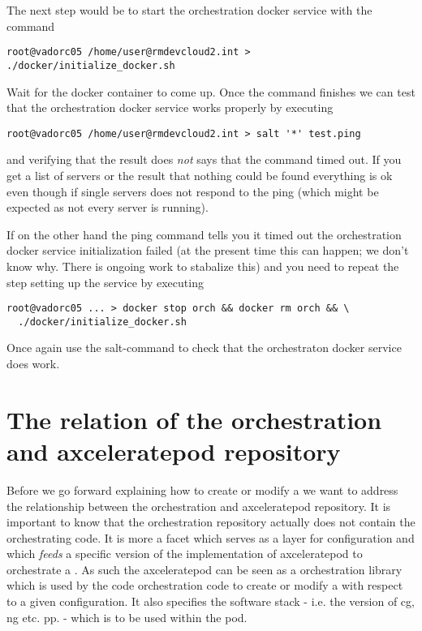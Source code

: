            The next step would be to start the orchestration docker service with the command
           \begin{verbatim}
root@vadorc05 /home/user@rmdevcloud2.int > ./docker/initialize_docker.sh
           \end{verbatim}
           Wait for the docker container to come up. Once the command finishes we can test that the orchestration docker service works properly by executing
           \begin{verbatim}
root@vadorc05 /home/user@rmdevcloud2.int > salt '*' test.ping
           \end{verbatim}
           and verifying that the result does \emph{not} says that the command timed out. If you get a list of servers or the result that nothing could be found everything is ok even though if single servers does not respond to the ping (which might be expected as not every server is running).

           If on the other hand the ping command tells you it timed out the orchestration docker service initialization failed (at the present time this can happen; we don't know why. There is ongoing work to stabalize this) and you need to repeat the step setting up the service by executing
           \begin{verbatim}
root@vadorc05 ... > docker stop orch && docker rm orch && \
  ./docker/initialize_docker.sh
           \end{verbatim}
           Once again use the salt-command to check that the orchestraton docker service does work.

	\section{The relation of the orchestration and axceleratepod repository}
	Before we go forward explaining how to create or modify a \pod{} we want to address the relationship between the orchestration and axceleratepod repository. It is important to know that the orchestration repository actually does not contain the orchestrating code. It is more a facet which serves as a layer for configuration and which \emph{feeds} a specific version of the implementation of axceleratepod to orchestrate a \pod{}. As such the axceleratepod can be seen as a orchestration library which is used by the code orchestration code to create or modify a \pod{} with respect to a given configuration. It also specifies the software stack - i.e. the version of cg, ng etc. pp. - which is to be used within the pod.
	
